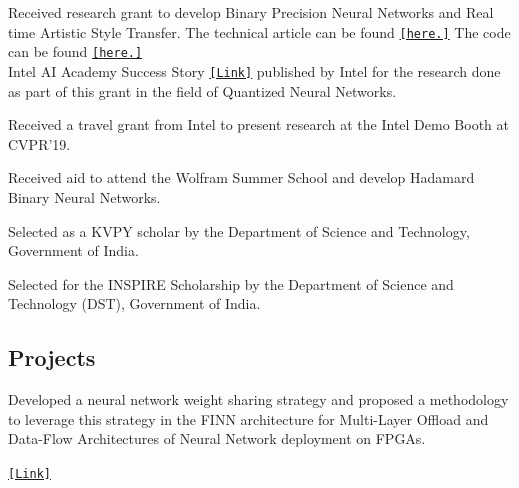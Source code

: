 \documentclass[]{deedy-resume-openfont}
\begin{document}
Received research grant to develop Binary Precision Neural Networks and Real time Artistic Style Transfer. The technical article can be found  \href{https://software.intel.com/en-us/articles/art-em-artistic-style-transfer-to-virtual-reality-final-update}{\texttt{[here.]}}
The code can be found \href{https://github.com/akhauriyash/Fast-style-transfer}{\texttt{[here.]}}\\
Intel AI Academy Success Story \href{https://software.intel.com/en-us/articles/developing-hadamard-neural-networks-on-the-intel-xeon-scalable-processor}{\texttt{[Link]}} published by Intel for the research done as part of this grant in the field of Quantized Neural Networks.
\sectionsep 

Received a travel grant from Intel to present research at the Intel Demo Booth at CVPR'19.\\
\sectionsep

Received aid to attend the Wolfram Summer School and develop Hadamard Binary Neural Networks. \\
\sectionsep

Selected as a KVPY scholar by the Department of Science and Technology, Government of India. \\
\sectionsep

Selected for the INSPIRE Scholarship by the Department of Science and Technology (DST), Government of India.\\
\vspace{1mm}
\sectionsep

\subsection{Projects}

Developed a neural network weight sharing strategy and proposed a methodology to leverage this strategy in the FINN architecture for Multi-Layer Offload and Data-Flow Architectures of Neural Network deployment on FPGAs. \\
\sectionsep

\href{https://docs.google.com/document/d/18uynX2yDSWm1BVCtG3Rd4CRb6xHiRxbvprUBTb4lvjY/edit?usp=sharing}{\texttt{[Link]}}\\
\sectionsep
\end{document}
